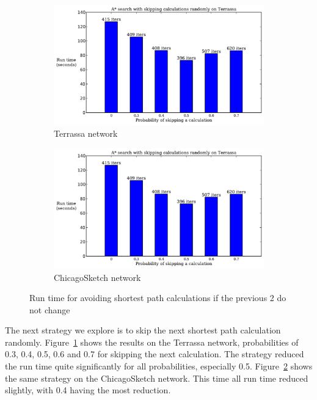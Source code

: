 \begin{figure}[H]
    \centering
    \begin{subfigure}{.5\textwidth}
        \centering
        \includegraphics[page=3,width=\textwidth]{img/random_time}
        \caption{Terrassa network}
        \label{fig:terrassa_random_n}
    \end{subfigure}%
    \begin{subfigure}{.5\textwidth}
        \centering
        \includegraphics[page=4,width=\textwidth]{img/random_time}
        \caption{ChicagoSketch network}
        \label{fig:chicago_random_n}
    \end{subfigure}
    \caption{Run time for avoiding shortest path calculations if the previous 2 do not change}
    \label{fig:random_n}
\end{figure}

The next strategy we explore is to skip the next shortest path calculation randomly.
Figure~\ref{fig:terrassa_random_n} shows the results on the Terrassa network, probabilities of 0.3, 0.4, 0.5, 0.6 and 0.7 for skipping the next calculation.
The strategy reduced the run time quite significantly for all probabilities,
especially 0.5.
Figure~\ref{fig:chicago_random_n} shows the same strategy on the ChicagoSketch network.
This time all run time reduced slightly, with 0.4 having the most reduction.

